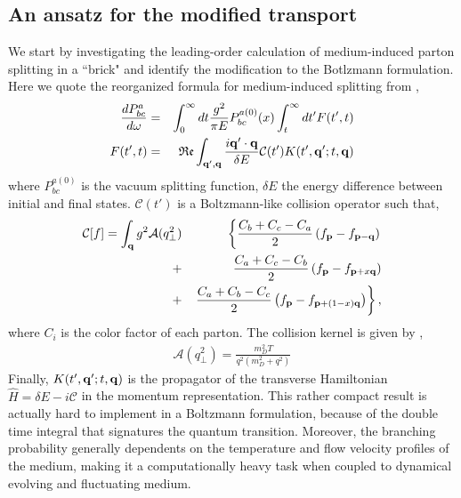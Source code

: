 \documentclass[aps, prc, reprint, amsmath, groupedaddress, nofootinbib]{revtex4-1}
\begin{document}
\subsection{An ansatz for the modified transport}
We start by investigating the leading-order calculation of medium-induced parton splitting in a ``brick" and identify the modification to the Botlzmann formulation.
Here we quote the reorganized formula for medium-induced splitting from \cite{CaronHuot:2010bp},
\begin{eqnarray}
\frac{dP^{a}_{bc}}{d\omega} &=& \int_0^\infty dt \frac{g^2}{\pi E} P_{bc}^{a(0)}(x) \int_t^\infty dt'  F(t', t)
\label{eq:full-theory}
\\
F(t', t) &=& \mathfrak{Re} \int_{{\bf q}', {\bf q}} \frac{i {\bf q}'\cdot {\bf q}}{\delta E} \mathcal{C}(t') K(t', {\bf q}'; t, {\bf q})
\end{eqnarray}
where $P_{bc}^{a(0)}$ is the vacuum splitting function, $\delta E$ the energy difference between initial and final states. 
$\mathcal{C}(t')$ is a Boltzmann-like collision operator such that,
\begin{eqnarray}
\mathcal{C}[f] = \int_{\bf q} g^2\mathcal{A}(q_\perp^2)
&&\left\{  \frac{C_b+C_c-C_a}{2}\left(f_{\bf p}-f_{{\bf p}-{\bf q}}\right) \right.\\\nonumber
 +&&    \frac{C_a+C_c-C_b}{2}\left(f_{\bf p}-f_{{\bf p}+x{\bf q}}\right) \\\nonumber
+&&  \left. \frac{C_a+C_b-C_c}{2}\left(f_{\bf p}-f_{{\bf p}+(1-x){\bf q}}\right)\right\},
\end{eqnarray}
where $C_i$ is the color factor of each parton. 
The collision kernel is given by \cite{Aurenche:2002pd},
\begin{eqnarray}
\mathcal{A}(q_\perp^2) = \frac{m_D^2 T}{q^2\left(m_D^2+q^2\right)}
\end{eqnarray}
Finally, $K(t', {\bf q}'; t, {\bf q})$ is the propagator of the transverse  Hamiltonian $\hat{H} = \delta E - i\mathcal{C}$ in the momentum representation.
This rather compact result is actually hard to implement in a Boltzmann formulation, because of the double time integral that signatures the quantum transition.
Moreover, the branching probability generally dependents on the temperature and flow velocity profiles of the medium, making it a computationally heavy task when coupled to dynamical evolving and fluctuating medium.
\end{document}
